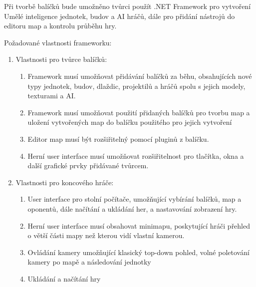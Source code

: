 Při tvorbě balíčků bude umožněno tvůrci použít .NET Framework pro vytvoření Umělé inteligence jednotek, budov a AI hráčů, dále pro přidání nástrojů do editoru map a  kontrolu průběhu hry.

Požadované vlastnosti frameworku:
\begin{enumerate}
	\item Vlastnosti pro tvůrce balíčků:
		\begin{enumerate}
			\item Framework musí umožňovat přidávání balíčků za běhu, obsahujících nové typy jednotek, budov,  dlaždic, projektilů a hráčů spolu s jejich modely, texturami a AI.
			\item Framework musí umožňovat použití přidaných balíčků pro tvorbu map a uložení vytvořených map do balíčku použitého pro jejich vytvoření
			\item Editor map musí být rozšiřitelný pomocí pluginů z balíčku.
			\item Herní user interface musí umožňovat rozšiřitelnost pro tlačítka, okna a další grafické prvky přidávané tvůrcem.
		\end{enumerate}

	\item Vlastnosti pro koncového hráče:
		\begin{enumerate}
			\item User interface pro stolní počítače, umožňující vybírání balíčků, map a oponentů, dále načítání a ukládání her, a nastavování zobrazení hry.
			\item Herní user interface musí obsahovat minimapu, poskytující hráči přehled o větší části mapy než kterou vidí vlastní kamerou.
			\item Ovládání kamery umožňující klasický top-down pohled, volné poletování kamery po mapě a následování jednotky
			\item Ukládání a načítání hry
		\end{enumerate}
\end{enumerate}
